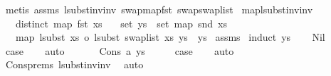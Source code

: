 \begin{isabellebody}
\endisadelimproof
%
\isatagproof
{}\isamarkupfalse%
\ {\isacharparenleft}{\kern0pt}metis\ assms{\isacharparenleft}{\kern0pt}{}{\isacharcomma}{\kern0pt}{}{\isacharparenright}{\kern0pt}\ lsubst{\isacharunderscore}{\kern0pt}inv{\isacharunderscore}{\kern0pt}inv\ swap{\isacharunderscore}{\kern0pt}map{\isacharunderscore}{\kern0pt}fst\ swap{\isacharunderscore}{\kern0pt}swap{\isacharunderscore}{\kern0pt}list{\isacharparenright}{\kern0pt}%
\endisatagproof
{\isafoldproof}%
%
\isadelimproof
\isanewline
%
\endisadelimproof
\isanewline
\isanewline
{}\isamarkupfalse%
\ map{\isacharunderscore}{\kern0pt}lsubst{\isacharunderscore}{\kern0pt}inv{\isacharunderscore}{\kern0pt}inv{\isacharcolon}{\kern0pt}\isanewline
\ \ \ {\isachardoublequoteopen}distinct\ {\isacharparenleft}{\kern0pt}map\ fst\ xs{\isacharparenright}{\kern0pt}{\isachardoublequoteclose}\isanewline
\ \ \ {\isachardoublequoteopen}set\ ys\ {\isasymsubseteq}\ set\ {\isacharparenleft}{\kern0pt}map\ snd\ xs{\isacharparenright}{\kern0pt}{\isachardoublequoteclose}\isanewline
\ \ \ {\isachardoublequoteopen}map\ {\isacharparenleft}{\kern0pt}lsubst\ xs\ o\ lsubst\ {\isacharparenleft}{\kern0pt}swap{\isacharunderscore}{\kern0pt}list\ xs{\isacharparenright}{\kern0pt}{\isacharparenright}{\kern0pt}\ ys\ {\isacharequal}{\kern0pt}\ ys{\isachardoublequoteclose}\isanewline
%
\isadelimproof
%
\endisadelimproof
%
\isatagproof
{}\isamarkupfalse%
\ assms\isanewline
{}\isamarkupfalse%
\ {\isacharparenleft}{\kern0pt}induct\ ys{\isacharparenright}{\kern0pt}\isanewline
\ \ \isamarkupfalse%
\ Nil\isanewline
\ \ \isamarkupfalse%
\ \isamarkupfalse%
\ {\isacharquery}{\kern0pt}case\isanewline
\ \ \isamarkupfalse%
\ auto\isanewline
\ \ \isamarkupfalse%
\isanewline
{}\isamarkupfalse%
\isanewline
\ \ \isamarkupfalse%
\ {\isacharparenleft}{\kern0pt}Cons\ a\ ys{\isacharparenright}{\kern0pt}\isanewline
\ \ \isamarkupfalse%
\ \isamarkupfalse%
\ {\isacharquery}{\kern0pt}case\isanewline
\ \ \isamarkupfalse%
\ auto\isanewline
\ \ \isamarkupfalse%
\ Cons{\isachardot}{\kern0pt}prems{\isacharparenleft}{\kern0pt}{}{\isacharparenright}{\kern0pt}\ lsubst{\isacharunderscore}{\kern0pt}inv{\isacharunderscore}{\kern0pt}inv\ \isamarkupfalse%
\ auto\isanewline

\end{isabellebody}
